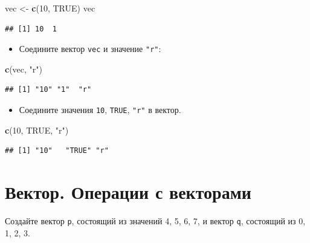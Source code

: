 \documentclass[]{book}
\newenvironment{Shaded}{\begin{snugshade}}{\end{snugshade}}
\newcommand{\DecValTok}[1]{\textcolor[rgb]{0.00,0.00,0.81}{#1}}
\newcommand{\KeywordTok}[1]{\textcolor[rgb]{0.13,0.29,0.53}{\textbf{#1}}}
\newcommand{\NormalTok}[1]{#1}
\newcommand{\OtherTok}[1]{\textcolor[rgb]{0.56,0.35,0.01}{#1}}
\newcommand{\StringTok}[1]{\textcolor[rgb]{0.31,0.60,0.02}{#1}}
\providecommand{\tightlist}{%
  \setlength{\itemsep}{0pt}\setlength{\parskip}{0pt}}
\begin{document}
\begin{Shaded}
\begin{Highlighting}[]
\NormalTok{vec <-}\StringTok{ }\KeywordTok{c}\NormalTok{(}\DecValTok{10}\NormalTok{, }\OtherTok{TRUE}\NormalTok{)}
\NormalTok{vec}
\end{Highlighting}
\end{Shaded}

\begin{verbatim}
## [1] 10  1
\end{verbatim}

\begin{itemize}
\tightlist
\item
  Соедините вектор \texttt{vec} и значение \texttt{"r"}:
\end{itemize}

\begin{Shaded}
\begin{Highlighting}[]
\KeywordTok{c}\NormalTok{(vec, }\StringTok{"r"}\NormalTok{)}
\end{Highlighting}
\end{Shaded}

\begin{verbatim}
## [1] "10" "1"  "r"
\end{verbatim}

\begin{itemize}
\tightlist
\item
  Соедините значения \texttt{10}, \texttt{TRUE}, \texttt{"r"} в вектор.
\end{itemize}

\begin{Shaded}
\begin{Highlighting}[]
\KeywordTok{c}\NormalTok{(}\DecValTok{10}\NormalTok{, }\OtherTok{TRUE}\NormalTok{, }\StringTok{"r"}\NormalTok{)}
\end{Highlighting}
\end{Shaded}

\begin{verbatim}
## [1] "10"   "TRUE" "r"
\end{verbatim}

\hypertarget{solvvec_op}{%
\section{Вектор. Операции с векторами}\label{solvvec_op}}

Создайте вектор \texttt{p}, состоящий из значений 4, 5, 6, 7, и вектор \texttt{q}, состоящий из 0, 1, 2, 3.
\end{document}
